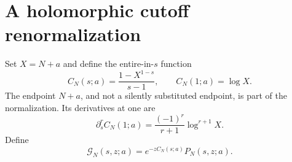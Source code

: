 \documentclass[11pt]{article}
\numberwithin{equation}{section}
\theoremstyle{definition}\newtheorem{definition}[theorem]{Definition}
\theoremstyle{remark}\newtheorem{remark}[theorem]{Remark}
\newcommand{\G}{\mathcal G}\newcommand{\F}{\mathfrak F}
\begin{document}
\section{A holomorphic cutoff renormalization}
\label{sec:renorm}
Set $X=N+a$ and define the entire-in-$s$ function
\begin{equation}
 C_N(s;a)=\frac{1-X^{1-s}}{s-1},\qquad
 C_N(1;a)=\log X.
 \label{eq:counterterm}
\end{equation}
The endpoint $N+a$, and not a silently substituted endpoint, is part of the
normalization. Its derivatives at one are
\begin{equation}
 \partial_s^r C_N(1;a)=\frac{(-1)^r}{r+1}\log^{r+1}X.
 \label{eq:counterderivative}
\end{equation}
Define
\begin{equation}
 \G_N(s,z;a)=e^{-zC_N(s;a)}P_N(s,z;a).
 \label{eq:GN}
\end{equation}
\end{document}
